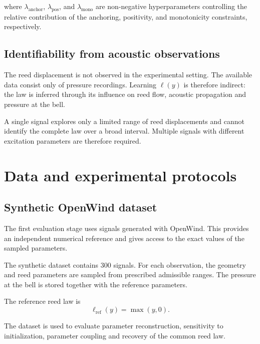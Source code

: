 \documentclass[11pt,a4paper]{report}
\theoremstyle{plain}
\theoremstyle{definition}
\begin{document}
where
\(\lambda_{\mathrm{anchor}}\),
\(\lambda_{\mathrm{pos}}\), and
\(\lambda_{\mathrm{mono}}\)
are non-negative hyperparameters controlling the relative contribution of the
anchoring, positivity, and monotonicity constraints, respectively.

\subsection{Identifiability from acoustic observations}

The reed displacement is not observed in the experimental setting. The
available data consist only of pressure recordings. Learning \(\ell(y)\) is
therefore indirect: the law is inferred through its influence on reed flow,
acoustic propagation and pressure at the bell.

A single signal explores only a limited range of reed displacements and cannot
identify the complete law over a broad interval. Multiple signals with
different excitation parameters are therefore required.


\section{Data and experimental protocols}
\label{sec:data_protocols}

\subsection{Synthetic OpenWind dataset}

The first evaluation stage uses signals generated with OpenWind. This provides
an independent numerical reference and gives access to the exact values of the
sampled parameters.

The synthetic dataset contains \(300\) signals. For each observation, the
geometry and reed parameters are sampled from prescribed admissible ranges. The
pressure at the bell is stored together with the reference parameters.

The reference reed law is
\begin{equation}
\ell_{\mathrm{ref}}(y)
=
\max(y,0).
\end{equation}

The dataset is used to evaluate parameter reconstruction, sensitivity to
initialization, parameter coupling and recovery of the common reed law.
\end{document}
